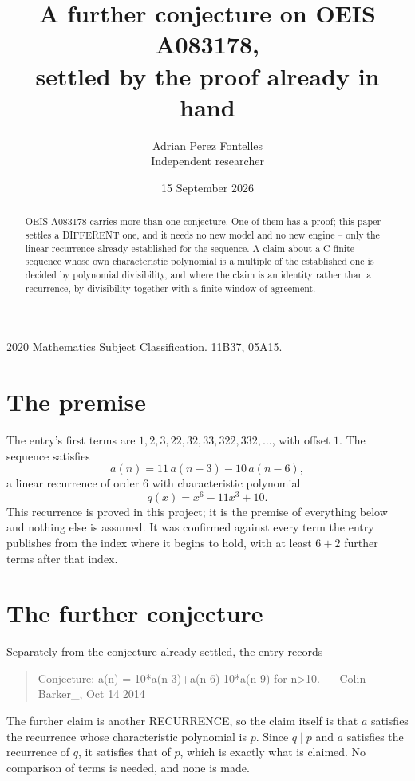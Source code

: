 \documentclass[11pt,a4paper]{article}
\title{A further conjecture on OEIS A083178,\\ \large settled by the proof already in hand}
\author{Adrian Perez Fontelles\\ \small Independent researcher}
\date{15 September 2026}
\theoremstyle{plain}
\theoremstyle{definition}
\begin{document}
\maketitle

\begin{abstract}
OEIS A083178 carries more than one conjecture. One of them has a proof; this paper settles a
DIFFERENT one, and it needs no new model and no new engine -- only the linear recurrence already
established for the sequence. A claim about a C-finite sequence whose own characteristic
polynomial is a multiple of the established one is decided by polynomial divisibility, and where
the claim is an identity rather than a recurrence, by divisibility together with a finite window
of agreement.
\end{abstract}

\noindent\small 2020 Mathematics Subject Classification. 11B37, 05A15.\normalsize

\section{The premise}

The entry's first terms are $1, 2, 3, 22, 32, 33, 322, 332,\dots$, with offset $1$. The sequence satisfies
\[
  a(n)=11\,a(n-3) - 10\,a(n-6) ,
\]
a linear recurrence of order $6$ with characteristic polynomial
\[
  q(x)=x^{6} - 11 x^{3} + 10 .
\]
This recurrence is proved in this project; it is the premise of everything below and nothing else is assumed.
It was confirmed against every term the entry publishes from the index where it begins to hold,
with at least $6+2$ further terms after that index.

\section{The further conjecture}

Separately from the conjecture already settled, the entry records

\begin{quote}\raggedright Conjecture: a(n) = 10*a(n-3)+a(n-6)-10*a(n-9) for n>10. - \_Colin Barker\_, Oct 14 2014\end{quote}

The further claim is another RECURRENCE, so the claim itself is that $a$ satisfies the
recurrence whose characteristic polynomial is $p$. Since $q\mid p$ and $a$ satisfies the
recurrence of $q$, it satisfies that of $p$, which is exactly what is claimed. No comparison of
terms is needed, and none is made.
\end{document}
